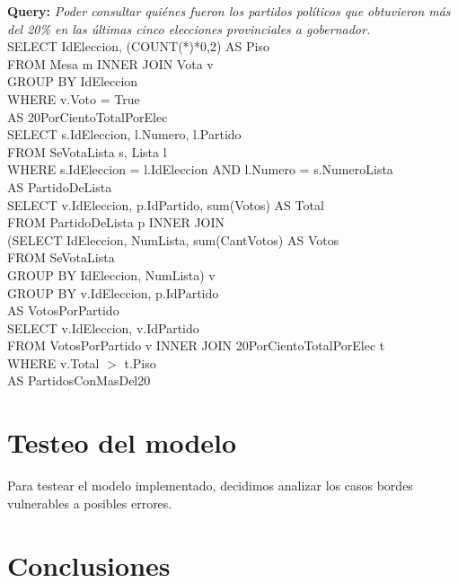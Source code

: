 \documentclass[10pt,a4paper]{article}
\begin{document}
\textbf{Query:} \textit{Poder consultar quiénes fueron los partidos políticos que obtuvieron más del 20\% en las últimas cinco elecciones provinciales a gobernador.}\\

SELECT IdEleccion, (COUNT(*)*0,2) AS Piso\\
FROM Mesa m INNER JOIN Vota v\\
GROUP BY IdEleccion\\
WHERE v.Voto = True\\
AS 20PorCientoTotalPorElec\\

SELECT s.IdEleccion, l.Numero, l.Partido\\
FROM SeVotaLista s, Lista l\\
WHERE s.IdEleccion = l.IdEleccion AND l.Numero = s.NumeroLista\\
AS PartidoDeLista\\

SELECT v.IdEleccion, p.IdPartido, sum(Votos) AS Total\\
FROM PartidoDeLista p INNER JOIN\\
(SELECT IdEleccion, NumLista, sum(CantVotos) AS Votos\\
FROM SeVotaLista\\
GROUP BY IdEleccion, NumLista) v\\
GROUP BY v.IdEleccion, p.IdPartido\\
AS VotosPorPartido\\

SELECT v.IdEleccion, v.IdPartido\\
FROM VotosPorPartido v INNER JOIN 20PorCientoTotalPorElec t\\
WHERE v.Total $>$ t.Piso\\
AS PartidosConMasDel20\\

\newpage
\section{Testeo del modelo}
Para testear el modelo implementado, decidimos analizar los casos bordes vulnerables a posibles errores.



\newpage
\section{Conclusiones}
\end{document}
